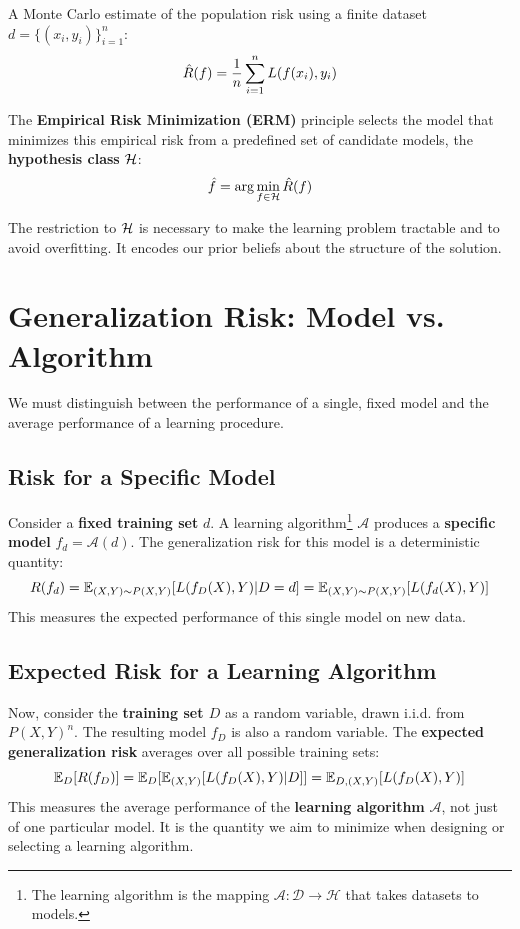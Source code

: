 \begin{notechapter}
\begin{definition}
    A Monte Carlo estimate of the population risk using a finite dataset \( d = \{(x_i, y_i)\}_{i=1}^n \):
    \[
    \hat{R}(f) = \frac{1}{n} \sum_{i=1}^n L(f(x_i), y_i)
    \]
\end{definition}

The \textbf{Empirical Risk Minimization (ERM)} principle selects the model that minimizes this empirical risk from a predefined set of candidate models, the \textbf{hypothesis class} \( \mathcal{H} \):
\[
\hat{f} = \arg\min_{f \in \mathcal{H}} \hat{R}(f)
\]

The restriction to \( \mathcal{H} \) is necessary to make the learning problem tractable and to avoid overfitting. It encodes our prior beliefs about the structure of the solution.

\section{Generalization Risk: Model vs. Algorithm}
\label{generalization-risk:sec:model_vs_alg}

We must distinguish between the performance of a single, fixed model and the average performance of a learning procedure.

\subsection{Risk for a Specific Model}
Consider a \textbf{fixed training set} \( d \). A learning algorithm\footnote{
    The learning algorithm is the mapping 
    \( \mathcal{A}:\mathcal{D}\rightarrow\mathcal{H} \)
    that takes datasets to models.}
    \( \mathcal{A} \) produces a 
    \textbf{specific model} \( f_d = \mathcal{A}(d) \). 
    The generalization risk for this model is a deterministic quantity:
\[
R(f_d) = \mathbb{E}_{(X,Y)\sim P(X,Y)}[L(f_D(X), Y)|D=d] =
\mathbb{E}_{(X,Y)\sim P(X,Y)}[L(f_d(X), Y)]
\]
This measures the expected performance of this single model on new data.

\subsection{Expected Risk for a Learning Algorithm}
Now, consider the \textbf{training set \( D \)} as a random variable, drawn i.i.d. from \( P(X, Y)^n \). The resulting model \( f_D \) is also a random variable. The \textbf{expected generalization risk} averages over all possible training sets:
\[
\mathbb{E}_{D}[R(f_D)] 
= \mathbb{E}_{D}[\mathbb{E}_{(X,Y)}[L(f_D(X), Y)|D]]
= \mathbb{E}_{D, (X,Y)}[L(f_D(X), Y)]
\]
This measures the average performance of the \textbf{learning algorithm} \( \mathcal{A} \), not just of one particular model. It is the quantity we aim to minimize when designing or selecting a learning algorithm.

\end{notechapter}
